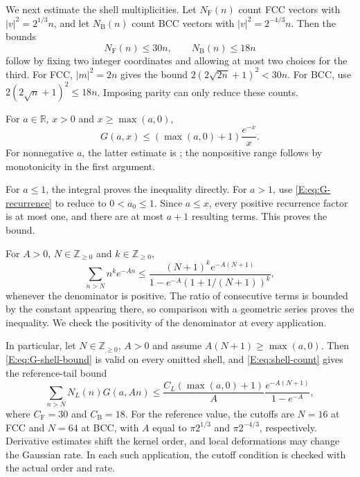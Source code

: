 \documentclass[reqno,english]{amsart}
\theoremstyle{definition}
\newtheorem{open problem}[theorem]{Open Problem}
\theoremstyle{remark}
\theoremstyle{plain}
\newcommand{\R}{{\mathbb R}}
\numberwithin{equation}{section}
\newcommand{\Z}{\mathbb Z}
\begin{document}
We next estimate the shell multiplicities. Let $N_{\mathrm F}(n)$
count FCC vectors with $|v|^2=2^{1/3}n$, and let
$N_{\mathrm B}(n)$ count BCC vectors with $|v|^2=2^{-4/3}n$.
Then the bounds
\begin{equation}
 N_{\mathrm F}(n)\le30n,\qquad N_{\mathrm B}(n)\le18n
 \label{E:eq:shell-count}
\end{equation}
follow by fixing two integer coordinates and allowing at most two
choices for the third. For FCC, $|m|^2=2n$ gives the bound
$2(2\sqrt{2n}+1)^2<30n$. For BCC, use
$2(2\sqrt n+1)^2\le18n$. Imposing parity can only reduce these
counts.

For $a\in\R$, $x>0$ and $x\ge\max(a,0)$,
\begin{equation}
 G(a,x)\le(\max(a,0)+1)\frac{e^{-x}}x.
 \label{E:eq:G-shell-bound}
\end{equation}
For nonnegative $a$, the latter estimate is \cite[(35)]{SS}; the
nonpositive range follows by monotonicity in the first argument.

For $a\le1$, the integral proves the inequality directly. For
$a>1$, use \eqref{E:eq:G-recurrence} to reduce to $0<a_0\le1$.
Since $a\le x$, every positive recurrence factor is at most one,
and there are at most $a+1$ resulting terms. This proves the bound.

For $A>0$, $N\in\Z_{\ge0}$ and $k\in\Z_{\ge0}$,
\begin{equation}
 \sum_{n>N}n^ke^{-An}
 \le
 \frac{(N+1)^ke^{-A(N+1)}}{1-e^{-A}(1+1/(N+1))^k},
 \label{E:eq:geometric-tail}
\end{equation}
whenever the denominator is positive. The ratio of consecutive terms
is bounded by the constant appearing there, so comparison with a
geometric series proves the inequality. We check the positivity of
the denominator at every application.

In particular, let $N\in\Z_{\ge0}$, $A>0$ and assume
$A(N+1)\ge\max(a,0)$. Then \eqref{E:eq:G-shell-bound} is valid on every
omitted shell, and \eqref{E:eq:shell-count} gives the reference-tail bound
\begin{equation}
 \sum_{n>N}N_L(n)G(a,An)
 \le\frac{C_L(\max(a,0)+1)}{A}
 \frac{e^{-A(N+1)}}{1-e^{-A}},
 \label{E:eq:reference-tail-G}
\end{equation}
where $C_{\mathrm F}=30$ and $C_{\mathrm B}=18$.
For the reference value, the cutoffs are $N=16$ at FCC and $N=64$
at BCC, with $A$ equal to $\pi2^{1/3}$ and $\pi2^{-4/3}$,
respectively. Derivative estimates shift the kernel order, and local
deformations may change the Gaussian rate. In each such application,
the cutoff condition is checked with the actual order and rate.
\end{document}
